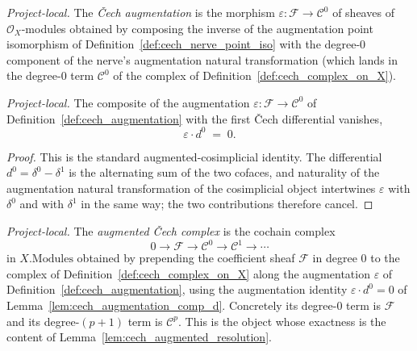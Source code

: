 \begin{definition}

  \label{def:cech_augmentation}
  \textit{Project-local.}
  The \emph{{\v C}ech augmentation} is the morphism \(\varepsilon : \mathcal{F} \to \mathcal{C}^0\) of
  sheaves of \(\mathcal{O}_X\)-modules obtained by composing the inverse of the augmentation point
  isomorphism of Definition~\ref{def:cech_nerve_point_iso} with the degree-\(0\) component of the
  nerve's augmentation natural transformation (which lands in the degree-\(0\) term \(\mathcal{C}^0\) of
  the complex of Definition~\ref{def:cech_complex_on_X}).
\end{definition}

\begin{lemma}
  \label{lem:cech_augmentation_comp_d}
  \textit{Project-local.}
  The composite of the augmentation \(\varepsilon : \mathcal{F} \to \mathcal{C}^0\) of
  Definition~\ref{def:cech_augmentation} with the first {\v C}ech differential vanishes,
  \[
    \varepsilon \cdot d^0 \;=\; 0.
  \]
\end{lemma}
\begin{proof}
  This is the standard augmented-cosimplicial identity. The differential \(d^0 = \delta^0 - \delta^1\)
  is the alternating sum of the two cofaces, and naturality of the augmentation natural transformation
  of the cosimplicial object intertwines \(\varepsilon\) with \(\delta^0\) and with \(\delta^1\) in the
  same way; the two contributions therefore cancel.
\end{proof}

\begin{definition}

  \label{def:cech_augmented_complex}
  \textit{Project-local.}
  The \emph{augmented {\v C}ech complex} is the cochain complex
  \[
    0 \to \mathcal{F} \to \mathcal{C}^0 \to \mathcal{C}^1 \to \cdots
  \]
  in \(X.\mathrm{Modules}\) obtained by prepending the coefficient sheaf \(\mathcal{F}\) in degree \(0\)
  to the complex of Definition~\ref{def:cech_complex_on_X} along the augmentation
  \(\varepsilon\) of Definition~\ref{def:cech_augmentation}, using the augmentation identity
  \(\varepsilon \cdot d^0 = 0\) of Lemma~\ref{lem:cech_augmentation_comp_d}. Concretely its degree-\(0\)
  term is \(\mathcal{F}\) and its degree-\((p+1)\) term is \(\mathcal{C}^p\). This is the object whose
  exactness is the content of Lemma~\ref{lem:cech_augmented_resolution}.
\end{definition}

